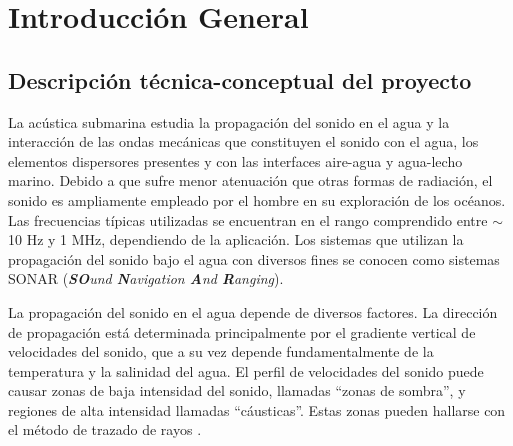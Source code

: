 
\chapter{Introducción General} %

\label{Chapter1} %
\label{IntroGeneral}


\newcommand{\keyword}[1]{\textbf{#1}}
\newcommand{\tabhead}[1]{\textbf{#1}}
\newcommand{\code}[1]{\texttt{#1}}
\newcommand{\file}[1]{\texttt{\bfseries#1}}
\newcommand{\option}[1]{\texttt{\itshape#1}}
\newcommand{\grados}{$^{\circ}$}



\section{Descripción técnica-conceptual del proyecto}


La acústica submarina estudia la propagación del sonido en el agua y la interacción de las ondas mecánicas que constituyen el sonido con el agua, los elementos dispersores presentes y con las interfaces aire-agua y agua-lecho marino.  Debido a que sufre menor atenuación que otras formas de radiación, el sonido es ampliamente empleado  por el hombre en su exploración de los océanos.  Las frecuencias típicas utilizadas se encuentran en el rango comprendido entre $\sim$10 Hz y 1 MHz, dependiendo de la aplicación.  Los sistemas que utilizan la propagación del sonido bajo el agua con diversos fines se conocen como sistemas SONAR (\textit{\textbf{SO}und \textbf{N}avigation \textbf{A}nd \textbf{R}anging}).

La propagación del sonido en el agua depende de diversos factores.  La dirección de propagación está determinada principalmente por el gradiente vertical de velocidades del sonido, que a su vez depende fundamentalmente de la temperatura y la salinidad del agua.  El perfil de velocidades del sonido puede causar zonas de baja intensidad del sonido, llamadas ``zonas de sombra'', y regiones de alta intensidad llamadas ``cáusticas''. Estas zonas pueden hallarse con el método de trazado de rayos \citep{tappert1977parabolic}.

